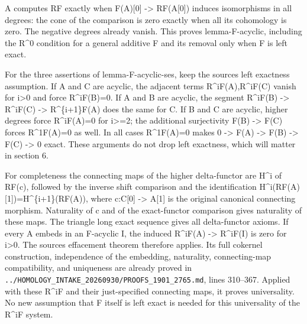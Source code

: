 \documentclass[11pt]{article}
\begin{document}
A computes RF exactly when F(A)\allowbreak{}[0]\allowbreak{} \allowbreak{}-> RF(A[0]\allowbreak{})\allowbreak{} induces isomorphisms in all degrees:\allowbreak{} the cone of the comparison is zero exactly when all its cohomology is zero. The negative degrees already vanish. This proves lemma-F-acyclic,\allowbreak{} including the R\^{}0 condition for a general additive F and its removal only when F is left exact.

For the three assertions of lemma-F-acyclic-ses,\allowbreak{} keep the source\textquotesingle s left exactness assumption. If A and C are acyclic,\allowbreak{} the adjacent terms R\textasciicircum{}iF(A)\allowbreak{},\allowbreak{}R\textasciicircum{}iF(C)\allowbreak{} vanish for i\textgreater0 and force R\textasciicircum{}iF(B)\allowbreak{}\allowbreak{}=0. If A and B are acyclic,\allowbreak{} the segment R\textasciicircum{}iF(B)\allowbreak{} \allowbreak{}-> R\textasciicircum{}iF(C)\allowbreak{} \allowbreak{}-> R\textasciicircum{}\{i\allowbreak{}+1\}F(A)\allowbreak{} does the same for C. If B and C are acyclic,\allowbreak{} higher degrees force R\textasciicircum{}iF(A)\allowbreak{}\allowbreak{}=0 for i>\allowbreak{}=2; the additional surjectivity F(B)\allowbreak{} \allowbreak{}-> F(C)\allowbreak{} forces R\textasciicircum{}1F(A)\allowbreak{}\allowbreak{}=0 as well. In all cases R\textasciicircum{}1F(A)\allowbreak{}\allowbreak{}=0 makes 0 \allowbreak{}-> F(A)\allowbreak{} \allowbreak{}-> F(B)\allowbreak{} \allowbreak{}-> F(C)\allowbreak{} \allowbreak{}-> 0 exact. These arguments do not drop left exactness,\allowbreak{} which will matter in section 6.

For completeness the connecting maps of the higher delta-functor are H\^{}i of RF(c)\allowbreak{},\allowbreak{} followed by the inverse shift comparison and the identification H\textasciicircum{}i(RF(A)\allowbreak{}[1]\allowbreak{})\allowbreak{}\allowbreak{}=H\textasciicircum{}\{i\allowbreak{}+1\}(RF(A)\allowbreak{})\allowbreak{},\allowbreak{} where c:\allowbreak{}C[0]\allowbreak{} \allowbreak{}-> A[1]\allowbreak{} is the original canonical connecting morphism. Naturality of c and of the exact-functor comparison gives naturality of these maps. The triangle long exact sequence gives all delta-functor axioms. If every A embeds in an F-acyclic I,\allowbreak{} the induced R\textasciicircum{}iF(A)\allowbreak{} \allowbreak{}-> R\textasciicircum{}iF(I)\allowbreak{} is zero for i\textgreater0. The source\textquotesingle s effacement theorem therefore applies. Its full cokernel construction,\allowbreak{} independence of the embedding,\allowbreak{} naturality,\allowbreak{} connecting-map compatibility,\allowbreak{} and uniqueness are already proved in \texttt{.\allowbreak{}.\allowbreak{}/\allowbreak{}HOMOLOGY\_\allowbreak{}INTAKE\_\allowbreak{}20260930/\allowbreak{}PROOFS\_\allowbreak{}1901\_\allowbreak{}2765.\allowbreak{}md},\allowbreak{} lines 310–\allowbreak{}367. Applied with these R\^{}iF and their just-specified connecting maps,\allowbreak{} it proves universality. No new assumption that F itself is left exact is needed for this universality of the R\^{}iF system.
\end{document}
